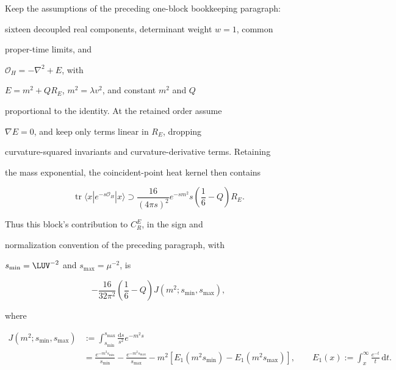 Keep the assumptions of the preceding one-block bookkeeping paragraph:

sixteen decoupled real components, determinant weight \(w=1\), common

proper-time limits, and

\(\mathcal O_H=-\nabla^2+E\), with

\(E=m^2+Q R_E\), \(m^2=\lambda v^2\), and constant \(m^2\) and \(Q\)

proportional to the identity. At the retained order assume

\(\nabla E=0\), and keep only terms linear in \(R_E\), dropping

curvature-squared invariants and curvature-derivative terms. Retaining

the mass exponential, the coincident-point heat kernel then contains

\[

\operatorname{tr}\langle x|e^{-s\mathcal O_H}|x\rangle

\supset

\frac{16}{(4\pi s)^2}e^{-sm^2}

s\left(\frac16-Q\right)R_E .

\]

Thus this block's contribution to \(C_R^E\), in the sign and

normalization convention of the preceding paragraph, with

\(s_{\min}=\LUV^{-2}\) and \(s_{\max}=\mu^{-2}\), is

\[

-\frac{16}{32\pi^2}\left(\frac16-Q\right)

J(m^2;s_{\min},s_{\max}),

\]

where

\[

\begin{aligned}

J(m^2;s_{\min},s_{\max})

&:=\int_{s_{\min}}^{s_{\max}}\frac{\mathrm{d}s}{s^2}e^{-m^2s}\\

&=\frac{e^{-m^2s_{\min}}}{s_{\min}}

 -\frac{e^{-m^2s_{\max}}}{s_{\max}}

 -m^2\left[

 E_1(m^2s_{\min})-E_1(m^2s_{\max})

 \right],

\qquad

E_1(x):=\int_x^\infty\frac{e^{-t}}{t}\,\mathrm{d}t .

\end{aligned}

\]

